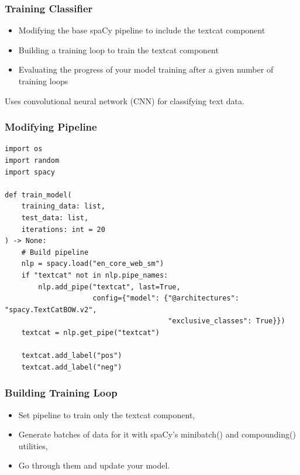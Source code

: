 \begin{frame}[fragile]\frametitle{Training Classifier}

\begin{itemize}
\item Modifying the base spaCy pipeline to include the textcat component
\item Building a training loop to train the textcat component
\item Evaluating the progress of your model training after a given number of training loops
\end{itemize}

Uses convolutional neural network (CNN) for classifying text data.


\end{frame}

\begin{frame}[fragile]\frametitle{Modifying Pipeline }

\begin{lstlisting}
import os
import random
import spacy

def train_model(
    training_data: list,
    test_data: list,
    iterations: int = 20
) -> None:
    # Build pipeline
    nlp = spacy.load("en_core_web_sm")
    if "textcat" not in nlp.pipe_names:
        nlp.add_pipe("textcat", last=True,
                     config={"model": {"@architectures": "spacy.TextCatBOW.v2",
                                       "exclusive_classes": True}})
    textcat = nlp.get_pipe("textcat")

    textcat.add_label("pos")
    textcat.add_label("neg")
\end{lstlisting}

\end{frame}

\begin{frame}[fragile]\frametitle{Building Training Loop }

\begin{itemize}
\item Set pipeline to train only the textcat component, 
\item Generate batches of data for it with spaCy’s minibatch() and compounding() utilities, 
\item Go through them and update your model.
\end{itemize}

\end{frame}

